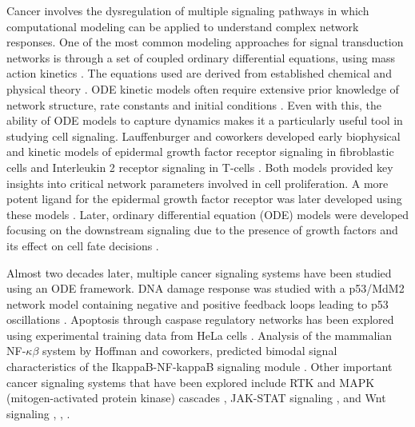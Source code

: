 \documentclass[12pt]{article}
\begin{document}
Cancer involves the dysregulation of multiple signaling pathways in which computational modeling can be applied to understand complex network responses. One of the most common modeling approaches for signal transduction networks is through a set of coupled ordinary differential equations, using mass action kinetics \cite{Aldridge2006}. The equations used are derived from established chemical and physical theory \cite{Aldridge2006}. ODE kinetic models often require extensive prior knowledge of network structure, rate constants and initial conditions \cite{Kholodenko2012}. Even with this, the ability of ODE models to capture dynamics makes it a particularly useful tool in studying cell signaling. Lauffenburger and coworkers developed early biophysical and kinetic models of epidermal growth factor receptor signaling in fibroblastic cells and Interleukin 2 receptor signaling in T-cells \cite{Starbuck1992, Forsten1994}. Both models provided key insights into critical network parameters involved in cell proliferation. A more potent ligand for the epidermal growth factor receptor was later developed using these models \cite{Reddy1996}. Later, ordinary differential equation (ODE) models were developed focusing on the downstream signaling due to the presence of growth factors and its effect on cell fate decisions \cite{Kholodenko1999, Schoeberl2002}. 

Almost two decades later, multiple cancer signaling systems have been studied using an ODE framework. DNA damage response was studied with a p53/MdM2 network model containing negative and positive feedback loops leading to p53 oscillations \cite{Ciliberto2005}. Apoptosis through caspase regulatory networks has been explored using experimental training data from HeLa cells \cite{Rehm2006,Albeck2008a,Albeck2008}. Analysis of the mammalian NF-$\kappa\beta$ system by Hoffman and coworkers, predicted bimodal signal characteristics of the IkappaB-NF-kappaB signaling module \cite{Hoffmann2002}. Other important cancer signaling systems that have been explored include RTK and MAPK (mitogen-activated protein kinase) cascades \cite{Bhalla2002, Schoeberl2002,Borisov2009,Chen2009}, JAK-STAT signaling \cite{Swameye2003,Vera2008}, and Wnt signaling \cite{Leeuwen2007}, \cite{Leeuwen2009}, \cite{Kim2007}. 
\end{document}
